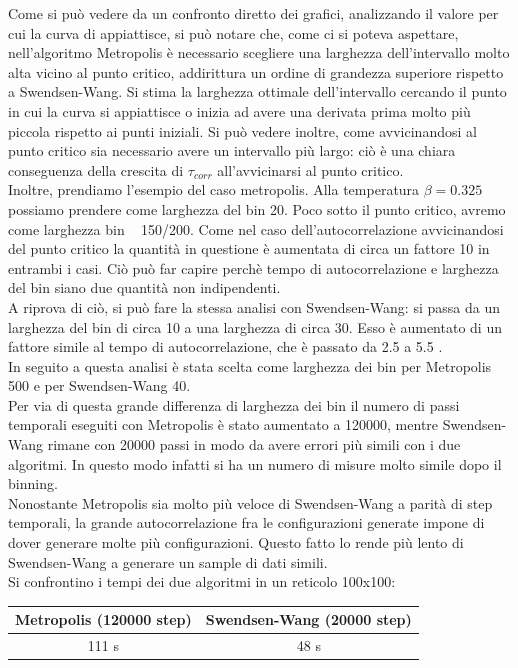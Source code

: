 Come si può vedere da un confronto diretto dei grafici, analizzando il valore per cui la curva di appiattisce, si può notare che, come ci si poteva aspettare, nell'algoritmo Metropolis è necessario scegliere una larghezza dell'intervallo molto alta vicino al punto critico, addirittura un ordine di grandezza superiore rispetto a Swendsen-Wang.
Si stima la larghezza ottimale dell'intervallo cercando il punto in cui la curva si appiattisce o inizia ad avere una derivata prima molto più piccola rispetto ai punti iniziali.
Si può vedere inoltre, come avvicinandosi al punto critico sia necessario avere un intervallo più largo: ciò è una chiara conseguenza della crescita di $\tau_{corr}$ all'avvicinarsi al punto critico.\\
Inoltre, prendiamo l'esempio del caso metropolis. Alla temperatura $\beta = 0.325$ possiamo prendere come larghezza del bin 20. Poco sotto il punto critico, avremo come larghezza bin ~ 150/200. Come nel caso dell'autocorrelazione avvicinandosi del punto critico la quantità in questione è aumentata di circa un fattore 10 in entrambi i casi.
Ciò può far capire perchè tempo di autocorrelazione e larghezza del bin siano due quantità non indipendenti.\\
A riprova di ciò, si può fare la stessa analisi con Swendsen-Wang: si passa da un larghezza del bin di circa 10 a una larghezza di circa 30. Esso è aumentato di un fattore simile al tempo di autocorrelazione, che è passato da 2.5 a 5.5 .\\
In seguito a questa analisi è stata scelta come larghezza dei bin per Metropolis  500 e per Swendsen-Wang 40.\\
Per via di questa grande differenza di larghezza dei bin il numero di passi temporali eseguiti con Metropolis è stato aumentato a 120000, mentre Swendsen-Wang rimane con 20000 passi in modo da avere errori più simili con i due algoritmi. In questo modo infatti si ha un numero di misure molto simile dopo il binning.\\
Nonostante Metropolis sia molto più veloce di Swendsen-Wang a parità di step temporali, la grande autocorrelazione fra le configurazioni generate impone di dover generare molte più configurazioni. Questo fatto lo rende più lento di Swendsen-Wang a generare un sample di dati simili.\\
Si confrontino i tempi dei due algoritmi in un reticolo 100x100:
\\
\begin{center}
\begin{tabular}{cc}
\toprule
	Metropolis (120000 step) & Swendsen-Wang (20000 step) \\
\midrule
	111 s & 48 s \\
\bottomrule
\end{tabular} 
\end{center}

